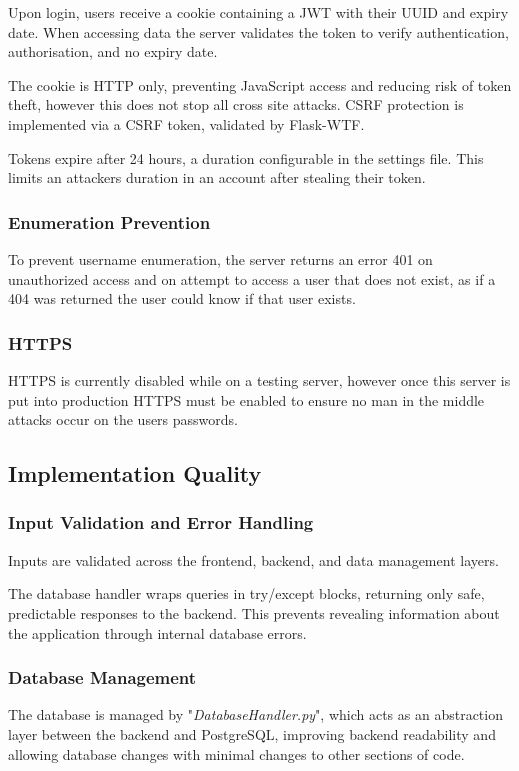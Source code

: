 Upon login, users receive a cookie containing a JWT with their UUID and expiry date. When accessing data the server validates the token to verify authentication, authorisation, and no expiry date.

The cookie is HTTP only, preventing JavaScript access and reducing risk of token theft, however this does not stop all cross site attacks. CSRF protection is implemented via a CSRF token, validated by Flask-WTF.

Tokens expire after 24 hours, a duration configurable in the settings file. This limits an attackers duration in an account after stealing their token.

\subsubsection{Enumeration Prevention}
To prevent username enumeration, the server returns an error 401 on unauthorized access and on attempt to access a user that does not exist, as if a 404 was returned the user could know if that user exists.

\subsubsection{HTTPS}
HTTPS is currently disabled while on a testing server, however once this server is put into production HTTPS must be enabled to ensure no man in the middle attacks occur on the users passwords.

\subsection{Implementation Quality}

\subsubsection{Input Validation and Error Handling}
Inputs are validated across the frontend, backend, and data management layers.

The database handler wraps queries in try/except blocks, returning only safe, predictable responses to the backend. This prevents revealing information about the application through internal database errors.

\subsubsection{Database Management}
The database is managed by "\textit{DatabaseHandler.py}", which acts as an abstraction layer between the backend and PostgreSQL, improving backend readability and allowing database changes with minimal changes to other sections of code.

